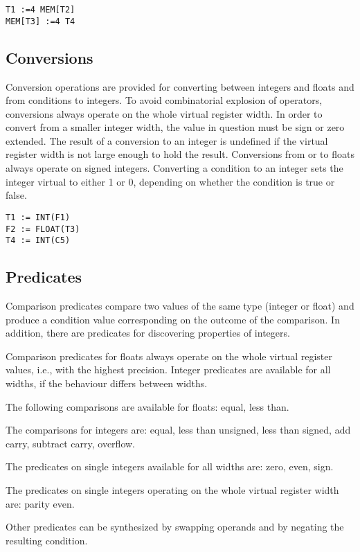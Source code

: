 \documentclass{article}
\begin{document}
\begin{verbatim}
T1 :=4 MEM[T2]
MEM[T3] :=4 T4
\end{verbatim}

\subsection{Conversions}

Conversion operations are provided for converting between integers and
floats and from conditions to integers.  To avoid combinatorial
explosion of operators, conversions always operate on the whole
virtual register width.  In order to convert from a smaller integer
width, the value in question must be sign or zero extended.  The
result of a conversion to an integer is undefined if the virtual
register width is not large enough to hold the result.  Conversions
from or to floats always operate on signed integers.  Converting a
condition to an integer sets the integer virtual to either 1 or 0,
depending on whether the condition is true or false.

\begin{verbatim}
T1 := INT(F1)
F2 := FLOAT(T3)
T4 := INT(C5)
\end{verbatim}

\subsection{Predicates}

Comparison predicates compare two values of the same type (integer or
float) and produce a condition value corresponding on the outcome of
the comparison.  In addition, there are predicates for discovering
properties of integers.

Comparison predicates for floats always operate on the whole virtual
register values, i.e., with the highest precision.  Integer predicates
are available for all widths, if the behaviour differs between widths.

The following comparisons are available for floats: equal, less than.

The comparisons for integers are: equal, less than unsigned, less than
signed, add carry, subtract carry, overflow.

The predicates on single integers available for all widths are: zero,
even, sign.

The predicates on single integers operating on the whole virtual
register width are: parity even.

Other predicates can be synthesized by swapping operands and by
negating the resulting condition.
\end{document}

